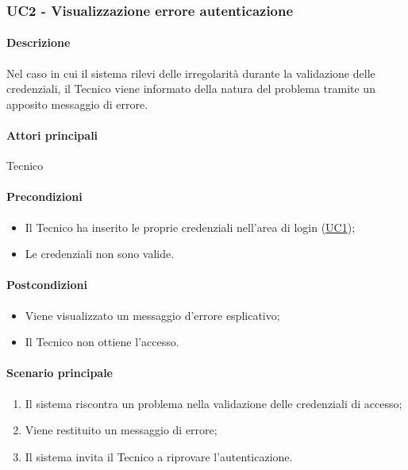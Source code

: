 \subsubsection{UC2 - Visualizzazione errore autenticazione}\label{UC2}

\paragraph*{Descrizione}
Nel caso in cui il sistema rilevi delle irregolarità durante la validazione delle credenziali, il Tecnico viene informato della natura del problema tramite un apposito messaggio di errore.

\paragraph*{Attori principali}
Tecnico

\paragraph*{Precondizioni}
\begin{itemize}
  \item Il Tecnico ha inserito le proprie credenziali nell'area di login (\hyperref[UC1]{UC1});
  \item Le credenziali non sono valide.
\end{itemize}

\paragraph*{Postcondizioni}
\begin{itemize}
  \item Viene visualizzato un messaggio d'errore esplicativo;
  \item Il Tecnico non ottiene l'accesso.
\end{itemize}

\paragraph*{Scenario principale}
\begin{enumerate}
  \item Il sistema riscontra un problema nella validazione delle credenziali di accesso;
  \item Viene restituito un messaggio di errore;
  \item Il sistema invita il Tecnico a riprovare l'autenticazione.
\end{enumerate}